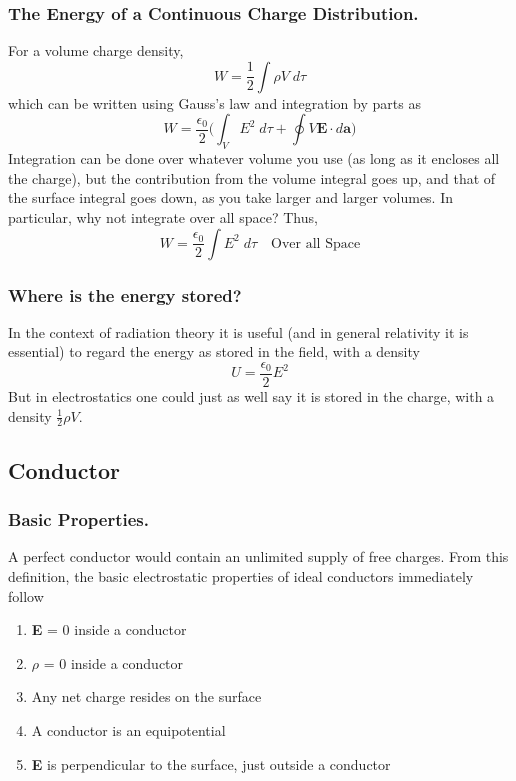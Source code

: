 \documentclass[../../../main.tex]{subfiles}
\begin{document}
\subsubsection{The Energy of a Continuous Charge Distribution.} For a volume charge density,
\begin{equation*}
    W=\frac{1}{2}\int\rho V\;d\tau
\end{equation*}
which can be written using Gauss's law and integration by parts as
\begin{equation*}
    W=\frac{\epsilon_0}{2}\Biggl(\int_{V}E^2\;d\tau+ \oint V\mathbf{E}\cdot d\mathbf{a}\Biggr)
\end{equation*}
Integration can be done over whatever volume you use (as long as it encloses all the charge), but the contribution from the volume integral goes up, and that of the surface integral goes down, as you take larger and larger volumes. In particular, why not integrate over all space? Thus,
\begin{equation*}
    W=\frac{\epsilon_0}{2}\int E^2\;d\tau\quad\text{Over all Space}
\end{equation*}

\subsubsection{Where is the energy stored?} In the context of radiation theory it is useful (and in general relativity it is essential) to regard the energy as stored in the field, with a density
\begin{equation*}
    U=\frac{\epsilon_0 }{2}E^2
\end{equation*}
But in electrostatics one could just as well say it is stored in the charge, with a density $\frac{1}{2}\rho V$.

\subsection{Conductor}
\subsubsection{Basic Properties.}
A perfect conductor would contain an unlimited supply of free charges. From this definition, the basic electrostatic properties of ideal conductors immediately follow
\begin{enumerate}
    \item \textbf{E} = 0 inside a conductor
    \item $\rho$ = 0 inside a conductor
    \item Any net charge resides on the surface
    \item A conductor is an equipotential
    \item \textbf{E} is perpendicular to the surface, just outside a conductor
\end{enumerate}
\end{document}
